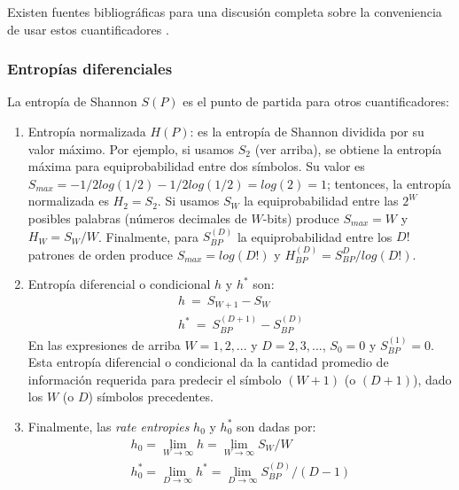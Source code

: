 Existen fuentes bibliográficas para una discusión completa sobre la conveniencia de usar estos cuantificadores \cite{DeMicco2008,Rosso2010,Rosso2012,Lopez-Ruiz1995,Martin2006,Wackerbauer1994,Rosso2007A}.

\subsubsection{Entropías diferenciales}
\label{subsec:addquanti}

La entropía de Shannon $S(P)$ es el punto de partida para otros cuantificadores:

\begin{enumerate}
	\item Entropía normalizada $H(P)$: es la entropía de Shannon dividida por su valor máximo. Por ejemplo, si usamos $S_2$ (ver arriba), se obtiene la entropía máxima para equiprobabilidad entre dos símbolos. Su valor es $S_{max}=-1/2 log(1/2)-1/2 log(1/2)=log(2)=1$; tentonces, la entropía normalizada es $H_2=S_2$. Si usamos $S_W$ la equiprobabilidad entre las $2^W$ posibles palabras (números decimales de $W$-bits) produce $S_{max}=W$ y $H_W=S_W/W$. Finalmente, para $S^{(D)}_{BP}$ la equiprobabilidad entre los $D!$ patrones de orden produce $S_{max}= log(D!)$ y $H^{(D)}_{BP}=S^D_{BP}/log(D!)$.
	\item Entropía diferencial o condicional $h$ y $h^*$ son:
	\begin{eqnarray}
	h~=~S_{W+1}-S_W\\
	h^*~=~S_{BP}^{(D+1)}-S_{BP}^{(D)}
	\end{eqnarray}
	En las expresiones de arriba $W=1,2,...$ y $D=2,3,...$, $S_0=0$ y $S_{BP}^{(1)}=0$. Esta entropía diferencial o condicional da la cantidad promedio de información requerida para predecir el símbolo $(W+1)$ (o $(D+1)$), dado los $W$ (o $D$) símbolos precedentes.
	\item Finalmente, las \emph{rate entropies} $h_0$ y $h_0^*$ \cite{Ebeling2001,Amigo2005} son dadas por:
	\begin{eqnarray}
	h_0=\lim\limits_{W\rightarrow \infty} h=\lim\limits_{W\rightarrow \infty}{S_{W}/W }\\
	h^*_0= \lim\limits_{D\rightarrow \infty} h^*=\lim\limits_{D\rightarrow \infty}{S^{(D)}_{BP}/(D-1)}
	\end{eqnarray}
\end{enumerate}
